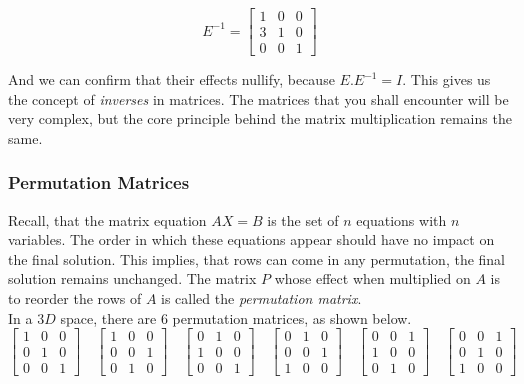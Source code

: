 $$
E^{-1} =
\begin{bmatrix}
    1 & 0 & 0 \\
    3 & 1 & 0 \\
    0 & 0 & 1
\end{bmatrix}
$$

And we can confirm that their effects nullify, because $E.E^{-1} = I$. This gives us the concept of \textit{inverses} in matrices. The matrices that you shall encounter will be very complex, but the core principle behind the matrix multiplication remains the same. 

\subsubsection{Permutation Matrices}

Recall, that the matrix equation $AX = B$ is the set of $n$ equations with $n$ variables. The order in which these equations appear should have no impact on the final solution. This implies, that rows can come in any permutation, the final solution remains unchanged. The matrix $P$ whose effect when multiplied on $A$ is to reorder the rows of $A$ is called the \textit{permutation matrix}. \\

In a $3D$ space, there are 6 permutation matrices, as shown below. \\

\[
\begin{bmatrix}
1 & 0 & 0 \\
0 & 1 & 0 \\
0 & 0 & 1
\end{bmatrix}
\hspace{1em}
\begin{bmatrix}
1 & 0 & 0 \\
0 & 0 & 1 \\
0 & 1 & 0
\end{bmatrix}
\hspace{1em}
\begin{bmatrix}
0 & 1 & 0 \\
1 & 0 & 0 \\
0 & 0 & 1
\end{bmatrix}
\hspace{1em}
\begin{bmatrix}
0 & 1 & 0 \\
0 & 0 & 1 \\
1 & 0 & 0
\end{bmatrix}
\hspace{1em}
\begin{bmatrix}
0 & 0 & 1 \\
1 & 0 & 0 \\
0 & 1 & 0
\end{bmatrix}
\hspace{1em}
\begin{bmatrix}
0 & 0 & 1 \\
0 & 1 & 0 \\
1 & 0 & 0
\end{bmatrix}
\] \\

